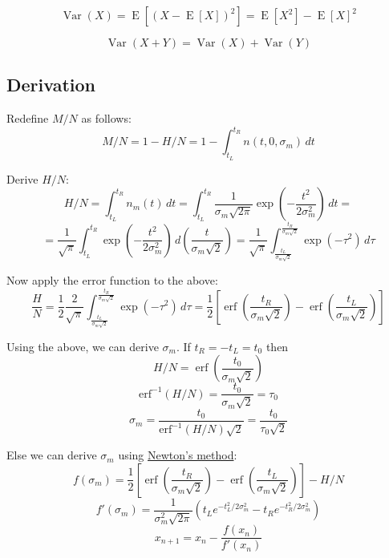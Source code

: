 \documentclass[12pt]{article}
\begin{document}
\begin{equation}
\operatorname{Var} (X) = \operatorname {E} \left[(X-\operatorname {E} [X])^{2}\right] = \operatorname {E} \left[X^{2}\right]-\operatorname {E} [X]^{2}
\label{eq:def_Variance}
\end{equation}

\begin{equation}
\operatorname {Var} (X+Y)=\operatorname {Var} (X)+\operatorname {Var} (Y)
\label{eq:def_Variance_sum}
\end{equation}

\pagebreak

\subsection*{Derivation}

Redefine \( M / N \) as follows:
\begin{equation}
M / N = 1 - H / N =
1 - \int_{t_L}^{t_R} n(t, 0, \sigma_m) \,dt
\end{equation}

Derive \( H / N \):
\[
H / N = \int_{t_L}^{t_R} n_m(t) \,dt =
\int_{t_L}^{t_R} \frac{1}{\sigma_m\sqrt{2\pi}} \exp\left(-\frac{t^2}{2\sigma_m^2} \right) \,dt =
\]
\[
= \frac{1}{\sqrt{\pi}} \int_{t_L}^{t_R} \exp\left(-\frac{t^2}{2\sigma_m^2} \right) \,d\left(\frac{t}{\sigma_m\sqrt{2}}\right) =
\frac{1}{\sqrt{\pi}} \int_{\frac{t_L}{\sigma_m\sqrt{2}}}^{\frac{t_R}{\sigma_m\sqrt{2}}} \exp\left(-\tau^2 \right) \,d\tau
\]

Now apply the error function to the above:
\[
\frac{H}{N} = \frac{1}{2}\frac{2}{\sqrt{\pi}} \int_{\frac{t_L}{\sigma_m\sqrt{2}}}^{\frac{t_R}{\sigma_m\sqrt{2}}} \exp\left(-\tau^2 \right) \,d\tau =
\frac{1}{2} \left[ \operatorname{erf}\left(\frac{t_R}{\sigma_m\sqrt{2}}\right) - \operatorname{erf}\left(\frac{t_L}{\sigma_m\sqrt{2}}\right) \right]
\]

Using the above, we can derive \(\sigma_m\).
If \(t_R = -t_L = t_0\) then
\[
H / N = \operatorname{erf}\left(\frac{t_0}{\sigma_m\sqrt{2}}\right)
\]
\[
\operatorname{erf^{-1}}\left(H / N\right) = \frac{t_0}{\sigma_m\sqrt{2}} = \tau_0
\]
\[
\sigma_m = \frac{t_0}{\operatorname{erf^{-1}}\left(H / N\right)\sqrt{2}} = \frac{t_0}{\tau_0\sqrt{2}}
\]

Else we can derive \(\sigma_m\) using \href{https://en.wikipedia.org/wiki/Newton%27s_method}{Newton's method}:
\[
f(\sigma_m) = \frac{1}{2} \left[
    \operatorname{erf}\left(\frac{t_R}{\sigma_m\sqrt{2}}\right) -
    \operatorname{erf}\left(\frac{t_L}{\sigma_m\sqrt{2}}\right)
\right] - H / N
\]
\[
f'(\sigma_m) = \frac{1}{\sigma_m^2\sqrt{2\pi}} \left(
    t_L e^{-t_L^2/2\sigma_m^2} -
    t_R e^{-t_R^2/2\sigma_m^2}
\right)
\]
\[
    x_{n+1}=x_{n}-{\frac {f(x_{n})}{f'(x_{n})}}
\]
\end{document}
